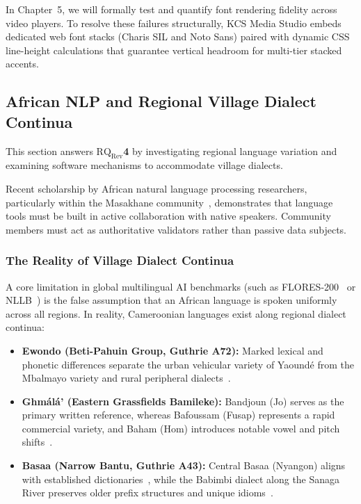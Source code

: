 \documentclass[a4paper,11pt]{article}
\begin{document}
In Chapter~5, we will formally test and quantify font rendering fidelity across video players. To resolve these failures structurally, KCS Media Studio embeds dedicated web font stacks (Charis SIL and Noto Sans) paired with dynamic CSS line-height calculations that guarantee vertical headroom for multi-tier stacked accents.

\subsection{African NLP and Regional Village Dialect Continua}
\label{sec:chap2_dialect}

This section answers \textbf{$\text{RQ}_{\text{Rev}}$4} by investigating regional language variation and examining software mechanisms to accommodate village dialects.

Recent scholarship by African natural language processing researchers, particularly within the Masakhane community~\cite{nekoto2020participatory, adelani2022masakhaner}, demonstrates that language tools must be built in active collaboration with native speakers. Community members must act as authoritative validators rather than passive data subjects.

\subsubsection{The Reality of Village Dialect Continua}
\label{sec:chap2_dialect_reality}
A core limitation in global multilingual AI benchmarks (such as FLORES-200~\cite{goyal2022flores} or NLLB~\cite{costajussa2022nllb}) is the false assumption that an African language is spoken uniformly across all regions. In reality, Cameroonian languages exist along regional dialect continua:
\begin{itemize}
    \item \textbf{Ewondo (Beti-Pahuin Group, Guthrie A72):} Marked lexical and phonetic differences separate the urban vehicular variety of Yaound\'e from the Mbalmayo variety and rural peripheral dialects~\cite{essono2000ewondo, bitjaakody2001basaa}.
    \item \textbf{Gh\textopeno m\'al\'a' (Eastern Grassfields Bamileke):} Bandjoun (Jo) serves as the primary written reference, whereas Bafoussam (Fusap) represents a rapid commercial variety, and Baham (Hom) introduces notable vowel and pitch shifts~\cite{sadembouo1984systematique, watters2003grassfields}.
    \item \textbf{Basaa (Narrow Bantu, Guthrie A43):} Central Basaa (Nyangon) aligns with established dictionaries~\cite{lemb1973dictionnaire}, while the Babimbi dialect along the Sanaga River preserves older prefix structures and unique idioms~\cite{bitjaakody2001basaa}.
\end{itemize}
\end{document}
